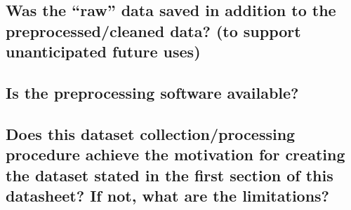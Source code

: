 \subsection*{Was the “raw” data saved in addition to the preprocessed/cleaned data? (\eg to support unanticipated future uses)}
\noindent
\subsection*{Is the preprocessing software available?}
\noindent
\subsection*{Does this dataset collection/processing procedure achieve the motivation for creating the dataset stated in the first section of this datasheet? If not, what are the limitations?}
\noindent
